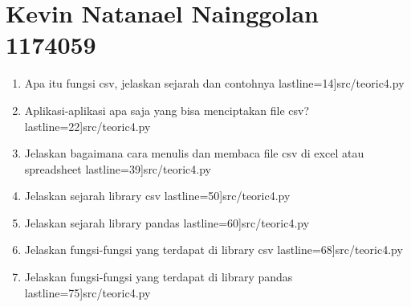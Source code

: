 \section {Kevin Natanael Nainggolan 1174059}
	\begin {enumerate}
		\item Apa itu fungsi csv, jelaskan sejarah dan contohnya 
			 lastline=14]{src/teoric4.py}
		\item Aplikasi-aplikasi apa saja yang bisa menciptakan file csv? 
			 lastline=22]{src/teoric4.py}
		\item Jelaskan bagaimana cara menulis dan membaca file csv di excel atau spreadsheet
			 lastline=39]{src/teoric4.py}
		\item Jelaskan sejarah library csv
			 lastline=50]{src/teoric4.py}
		\item Jelaskan sejarah library pandas
			 lastline=60]{src/teoric4.py}
		\item Jelaskan fungsi-fungsi yang terdapat di library csv
			 lastline=68]{src/teoric4.py}
		\item Jelaskan fungsi-fungsi yang terdapat di library pandas
			 lastline=75]{src/teoric4.py}
	\end {enumerate}